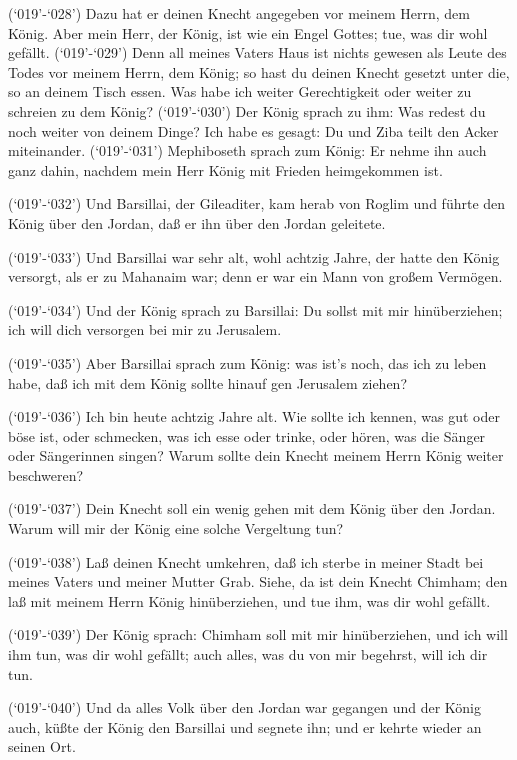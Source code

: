  (`019'-`028') Dazu hat er deinen Knecht angegeben vor
meinem Herrn, dem König. Aber mein Herr, der König, ist wie ein Engel
Gottes; tue, was dir wohl gefällt.  (`019'-`029') Denn all
meines Vaters Haus ist nichts gewesen als Leute des Todes vor meinem
Herrn, dem König; so hast du deinen Knecht gesetzt unter die, so an
deinem Tisch essen. Was habe ich weiter Gerechtigkeit oder weiter zu
schreien zu dem König?  (`019'-`030') Der König sprach zu
ihm: Was redest du noch weiter von deinem Dinge? Ich habe es gesagt: Du
und Ziba teilt den Acker miteinander.  (`019'-`031')
Mephiboseth sprach zum König: Er nehme ihn auch ganz dahin, nachdem mein
Herr König mit Frieden heimgekommen ist.

 (`019'-`032') Und Barsillai, der Gileaditer, kam herab von
Roglim und führte den König über den Jordan, daß er ihn über den Jordan
geleitete.

 (`019'-`033') Und Barsillai war sehr alt, wohl achtzig
Jahre, der hatte den König versorgt, als er zu Mahanaim war; denn er war
ein Mann von großem Vermögen.

 (`019'-`034') Und der König sprach zu Barsillai: Du sollst
mit mir hinüberziehen; ich will dich versorgen bei mir zu Jerusalem.

 (`019'-`035') Aber Barsillai sprach zum König: was ist's
noch, das ich zu leben habe, daß ich mit dem König sollte hinauf gen
Jerusalem ziehen?

 (`019'-`036') Ich bin heute achtzig Jahre alt. Wie sollte
ich kennen, was gut oder böse ist, oder schmecken, was ich esse oder
trinke, oder hören, was die Sänger oder Sängerinnen singen? Warum sollte
dein Knecht meinem Herrn König weiter beschweren?

 (`019'-`037') Dein Knecht soll ein wenig gehen mit dem
König über den Jordan. Warum will mir der König eine solche Vergeltung
tun?

 (`019'-`038') Laß deinen Knecht umkehren, daß ich sterbe
in meiner Stadt bei meines Vaters und meiner Mutter Grab. Siehe, da ist
dein Knecht Chimham; den laß mit meinem Herrn König hinüberziehen, und
tue ihm, was dir wohl gefällt.

 (`019'-`039') Der König sprach: Chimham soll mit mir
hinüberziehen, und ich will ihm tun, was dir wohl gefällt; auch alles,
was du von mir begehrst, will ich dir tun.

 (`019'-`040') Und da alles Volk über den Jordan war
gegangen und der König auch, küßte der König den Barsillai und segnete
ihn; und er kehrte wieder an seinen Ort.

